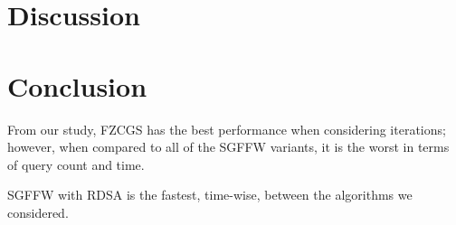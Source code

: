 \documentclass[10pt,twocolumn,letterpaper]{article}
\begin{document}
\section{Discussion}


\section{Conclusion}

From our study, FZCGS has the best performance when considering iterations;
however, when compared to all of the SGFFW variants, it is the worst in terms
of query count and time.

SGFFW with RDSA is the fastest, time-wise, between the algorithms we considered.


{\small


}
\end{document}
